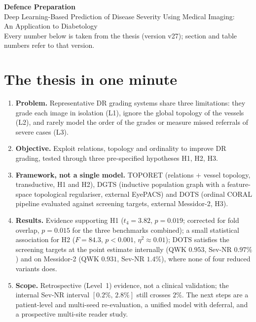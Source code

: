 \documentclass[11pt,a4paper]{article}
\begin{document}
\begin{center}
{\Large\bfseries\color{navy} Defence Preparation}\\[3pt]
{\large Deep Learning-Based Prediction of Disease Severity Using Medical Imaging:\\
An Application to Diabetology}\\[4pt]
{\small Every number below is taken from the thesis (version v27); section and table
numbers refer to that version.}
\end{center}

\section{The thesis in one minute}
\begin{enumerate}[leftmargin=1.5em,itemsep=1pt]
\item \textbf{Problem.} Representative DR grading systems share three limitations: they
grade each image in isolation (L1), ignore the global topology of the vessels (L2), and
rarely model the order of the grades or measure missed referrals of severe cases (L3).
\item \textbf{Objective.} Exploit relations, topology and ordinality to improve DR grading,
tested through three pre-specified hypotheses H1, H2, H3.
\item \textbf{Framework, not a single model.} TOPORET (relations $+$ vessel topology,
transductive, H1 and H2), DGTS (inductive population graph with a feature-space
topological regulariser, external EyePACS) and DOTS (ordinal CORAL pipeline evaluated
against screening targets, external Messidor-2, H3).
\item \textbf{Results.} Evidence supporting H1 ($t_4=3.82$, $p=0.019$; corrected for fold
overlap, $p=0.015$ for the three benchmarks combined); a small statistical association for H2
($F=84.3$, $p<0.001$, $\eta^2\approx0.01$); DOTS satisfies the screening targets at the point
estimate internally (QWK $0.953$, Sev-NR $0.97\%$) and on Messidor-2 (QWK $0.931$, Sev-NR
$1.4\%$), where none of four reduced variants does.
\item \textbf{Scope.} Retrospective (Level~1) evidence, not a clinical validation; the
internal Sev-NR interval $[0.2\%,\,2.8\%]$ still crosses $2\%$. The next steps are a
patient-level and multi-seed re-evaluation, a unified model with deferral, and a
prospective multi-site reader study.
\end{enumerate}
\end{document}
